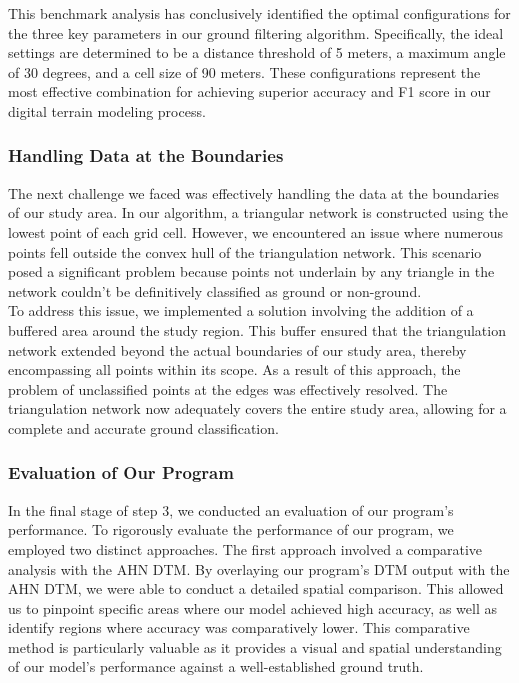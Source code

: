 \documentclass{article}
\begin{document}
\noindent This benchmark analysis has conclusively identified the optimal configurations for the three key parameters in our ground filtering algorithm. Specifically, the ideal settings are determined to be a distance threshold of 5 meters, a maximum angle of 30 degrees, and a cell size of 90 meters. These configurations represent the most effective combination for achieving superior accuracy and F1 score in our digital terrain modeling process.

\subsubsection{Handling Data at the Boundaries}
The next challenge we faced was effectively handling the data at the boundaries of our study area. In our algorithm, a triangular network is constructed using the lowest point of each grid cell. However, we encountered an issue where numerous points fell outside the convex hull of the triangulation network. This scenario posed a significant problem because points not underlain by any triangle in the network couldn't be definitively classified as ground or non-ground.\\

\noindent To address this issue, we implemented a solution involving the addition of a buffered area around the study region. This buffer ensured that the triangulation network extended beyond the actual boundaries of our study area, thereby encompassing all points within its scope. As a result of this approach, the problem of unclassified points at the edges was effectively resolved. The triangulation network now adequately covers the entire study area, allowing for a complete and accurate ground classification.

\subsubsection{Evaluation of Our Program}

In the final stage of step 3, we conducted an evaluation of our program's performance. To rigorously evaluate the performance of our program, we employed two distinct approaches. The first approach involved a comparative analysis with the AHN DTM. By overlaying our program's DTM output with the AHN DTM, we were able to conduct a detailed spatial comparison. This allowed us to pinpoint specific areas where our model achieved high accuracy, as well as identify regions where accuracy was comparatively lower. This comparative method is particularly valuable as it provides a visual and spatial understanding of our model's performance against a well-established ground truth.\\
\end{document}
